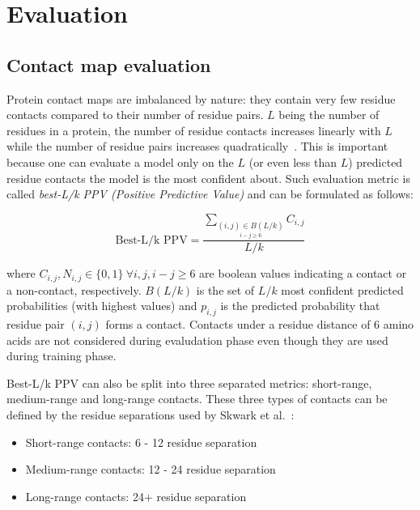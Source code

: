 \section{Evaluation}

  \subsection{Contact map evaluation}

    Protein contact maps are imbalanced by nature: they contain very few residue contacts compared to their number of residue pairs.
    $L$ being the number of residues in a protein, the number of residue contacts increases linearly with $L$ while the number of residue pairs
    increases quadratically~\cite{OLMEA1997S25}. This is important because one can evaluate a model only on the $L$ (or even less than $L$) predicted
    residue contacts the model is the most confident about. Such evaluation metric is called \textit{best-L/k PPV (Positive Predictive Value)}
    and can be formulated as follows:

    \begin{equation}
      \text{Best-L/k PPV} = \frac{\sum_{\underset {i-j \geq 6}{(i, j) \in B(L/k)}} C_{i, j}}{L/k}
    \end{equation}

    where $C_{i, j}, N_{i, j} \in \{0, 1\} \ \forall i, j, i-j \ge 6$ are boolean values indicating a contact or a non-contact, respectively.  %
    $B(L/k)$ is the set of $L/k$ most confident predicted probabilities (with highest values) and $p_{i, j}$ is the predicted probability  %
    that residue pair $(i, j)$ forms a contact.
    Contacts under a residue distance of 6 amino acids are not considered during evaludation phase even though they are used during
    training phase.

    Best-L/k PPV can also be split into three separated metrics: short-range, medium-range and long-range contacts.
    These three types of contacts can be defined by the residue separations used by Skwark et al.~\cite{10.1371/journal.pcbi.1003889}:

      \begin{itemize}
        \item Short-range contacts: 6 - 12 residue separation
        \item Medium-range contacts: 12 - 24 residue separation
        \item Long-range contacts: 24+ residue separation
      \end{itemize}

